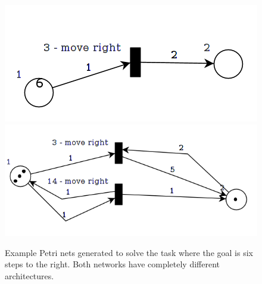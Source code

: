\documentclass[12pt,a4paper,twocolumn]{article}
\begin{document}
\begin{figure} [t]
\centering
\includegraphics[scale=0.3, trim = 0 5mm 0 20mm, clip = true]{PetriNet_1_3}
\includegraphics[scale=0.3, trim = 0 5mm 0 10mm, clip = true]{PetriNet_1_4}
\caption{Example Petri nets generated to solve the task where the goal is six steps to the right. Both networks have completely different architectures.}
\label{fig:pn1_2}
\end{figure}
\end{document}
